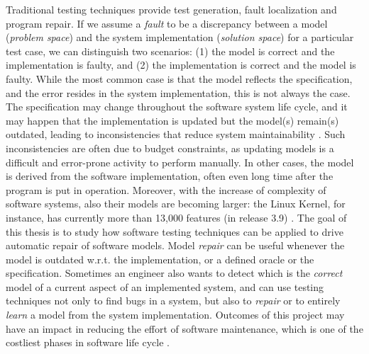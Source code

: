 Traditional testing techniques provide test generation, fault localization and program repair. %
If we assume a \textit{fault} to be a discrepancy between a model (\textit{problem space}) and the system implementation (\textit{solution space}) for a particular test case, we can distinguish two scenarios: (1) the model is correct and the implementation is faulty, and (2) the implementation is correct and the model is faulty.
While the most common case is that the model reflects the specification, and the error resides in the system implementation, this is not always the case.
The specification may change throughout the software system life cycle, and it may happen that the implementation is updated but the model(s) remain(s) outdated, leading to inconsistencies that reduce system maintainability \cite{rost2013software}. %
Such inconsistencies are often due to budget constraints, as updating models is a difficult and error-prone activity to perform manually. %
In other cases, the model is derived from the software implementation, often even long time after the program is put in operation. 
Moreover, with the increase of complexity of software systems, also their models are becoming larger: the Linux Kernel, for instance, has currently more than 13,000 features (in release 3.9) \cite{passos2018study}.
The goal of this thesis 
is to study how software testing techniques can be applied to drive automatic repair of software models.
Model \textit{repair} can be useful whenever the model is outdated w.r.t. the implementation, or a defined oracle or the specification.
Sometimes an engineer also wants to detect which is the \textit{correct} model of a current aspect of an implemented system, and can use testing techniques not only to find bugs in a system, but also to \textit{repair} or to entirely \textit{learn} a model from the system implementation. 
Outcomes of this project may have an impact in reducing the effort of software maintenance, which is one of the costliest phases in software life cycle \cite{zarnekow2005distribution}.

